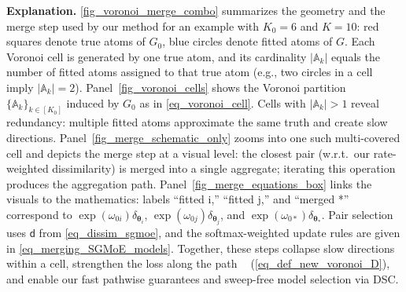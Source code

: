 \documentclass[twoside]{article}
\DeclareMathOperator*{\VDFRA}{D_{FRA}}
\newcommand{\divclus}{\mathsf{d}}
\theoremstyle{plain}
\theoremstyle{definition}
\theoremstyle{plain}
\def\vtheta{{\bm{\theta}}}
\def\sA{{\mathbb{A}}}
\begin{document}
\textbf{Explanation.}
\cref{fig_voronoi_merge_combo} summarizes the geometry and the merge step used by our method for an example with \(K_0=6\) and \(K=10\): red squares denote true atoms of \(G_0\), blue circles denote fitted atoms of \(G\).
Each Voronoi cell is generated by one true atom, and its cardinality \(|\sA_k|\) equals the number of fitted atoms assigned to that true atom (e.g., two circles in a cell imply \(|\sA_k|=2\)).
Panel~\cref{fig_voronoi_cells} shows the Voronoi partition \(\{\sA_k\}_{k\in[K_0]}\) induced by \(G_0\) as in \cref{eq_voronoi_cell}.
Cells with \(|\sA_k|>1\) reveal redundancy: multiple fitted atoms approximate the same truth and create slow directions.
Panel~\cref{fig_merge_schematic_only} zooms into one such multi-covered cell and depicts the merge step at a visual level:
the closest pair (w.r.t.\ our rate-weighted dissimilarity) is merged into a single aggregate; iterating this operation produces the aggregation path.
Panel~\cref{fig_merge_equations_box} links the visuals to the mathematics: labels “fitted i,” “fitted j,” and “merged *” correspond to
\(\exp(\omega_{0i})\delta_{\vtheta_i}\), \(\exp(\omega_{0j})\delta_{\vtheta_j}\), and \(\exp(\omega_{0*})\delta_{\vtheta_*}\).
Pair selection uses \(\divclus\) from \cref{eq_dissim_sgmoe}, and the softmax-weighted update rules are given in \cref{eq_merging_SGMoE_models}.
Together, these steps collapse slow directions within a cell, strengthen the loss along the path \(\VDFRA\) (\cref{eq_def_new_voronoi_D}), and enable our fast pathwise guarantees and sweep-free model selection via DSC.
\end{document}

